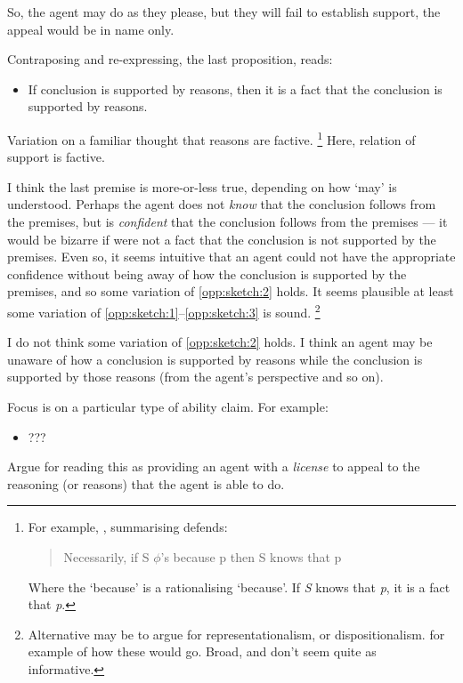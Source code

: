 \documentclass[10pt]{article}
\begin{document}
So, the agent may do as they please, but they will fail to establish support, the appeal would be in name only.

Contraposing and re-expressing, the last proposition, reads:

\begin{itemize}
\item If conclusion is supported by reasons, then it is a fact that the conclusion is supported by reasons.
\end{itemize}

Variation on a familiar thought that reasons are factive.\nolinebreak
\footnote{
  For example, \textcite[673]{Cunningham:2020aa}, summarising \textcite{Hornsby:2007aa,Hornsby:2007ab,Hornsby:2008aa} defends:
  \begin{quote}
    Necessarily, if S \(\phi\)'s because p then S knows that p
  \end{quote}
  Where the `because' is a rationalising `because'.
  If \emph{S} knows that \emph{p}, it is a fact that \emph{p}.
}
Here, relation of support is factive.

I think the last premise is more-or-less true, depending on how `may' is understood.
Perhaps the agent does not \emph{know} that the conclusion follows from the premises, but is \emph{confident} that the conclusion follows from the premises --- it would be bizarre if were not a fact that the conclusion is not supported by the premises.
Even so, it seems intuitive that an agent could not have the appropriate confidence without being away of how the conclusion is supported by the premises, and so some variation of \ref{opp:sketch:2} holds.
It seems plausible at least some variation of \ref{opp:sketch:1}--\ref{opp:sketch:3} is sound.\nolinebreak
\footnote{
  Alternative may be to argue for representationalism, or dispositionalism.
  \citeauthor{Neta:2019aa} for example of how these would go.
  Broad, and don't seem quite as informative.
}

I do not think some variation of \ref{opp:sketch:2} holds.
I think an agent may be unaware of how a conclusion is supported by reasons while the conclusion is supported by those reasons (from the agent's perspective and so on).

Focus is on a particular type of ability claim.
For example:
\begin{itemize}
\item ???
\end{itemize}

Argue for reading this as providing an agent with a \emph{license} to appeal to the reasoning (or reasons) that the agent is able to do.
\end{document}
